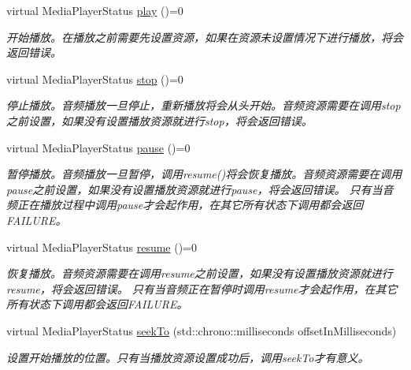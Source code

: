 \begin{DoxyCompactItemize}
virtual Media\+Player\+Status \hyperlink{classduerOSDcsSDK_1_1sdkInterfaces_1_1MediaPlayerInterface_a04f45089480e2177b42584ba51a073c0}{play} ()=0
\begin{DoxyCompactList}\small\item\em 开始播放。在播放之前需要先设置资源，如果在资源未设置情况下进行播放，将会返回错误。 \end{DoxyCompactList}\item 
virtual Media\+Player\+Status \hyperlink{classduerOSDcsSDK_1_1sdkInterfaces_1_1MediaPlayerInterface_ad9ddff784aa732be0a8b11706e3c9b09}{stop} ()=0
\begin{DoxyCompactList}\small\item\em 停止播放。音频播放一旦停止，重新播放将会从头开始。音频资源需要在调用stop之前设置，如果没有设置播放资源就进行stop，将会返回错误。 \end{DoxyCompactList}\item 
virtual Media\+Player\+Status \hyperlink{classduerOSDcsSDK_1_1sdkInterfaces_1_1MediaPlayerInterface_abb1516401c99e93714723360ef093ac9}{pause} ()=0
\begin{DoxyCompactList}\small\item\em 暂停播放。音频播放一旦暂停，调用resume()将会恢复播放。音频资源需要在调用pause之前设置，如果没有设置播放资源就进行pause，将会返回错误。 只有当音频正在播放过程中调用pause才会起作用，在其它所有状态下调用都会返回\+F\+A\+I\+L\+U\+R\+E。 \end{DoxyCompactList}\item 
virtual Media\+Player\+Status \hyperlink{classduerOSDcsSDK_1_1sdkInterfaces_1_1MediaPlayerInterface_affeabe3384e46924a96cd146e3c8dba0}{resume} ()=0
\begin{DoxyCompactList}\small\item\em 恢复播放。音频资源需要在调用resume之前设置，如果没有设置播放资源就进行resume，将会返回错误。 只有当音频正在暂停时调用resume才会起作用，在其它所有状态下调用都会返回\+F\+A\+I\+L\+U\+R\+E。 \end{DoxyCompactList}\item 
virtual Media\+Player\+Status \hyperlink{classduerOSDcsSDK_1_1sdkInterfaces_1_1MediaPlayerInterface_a90c26a82b954c116602034368351d05c}{seek\+To} (std\+::chrono\+::milliseconds offset\+In\+Milliseconds)
\begin{DoxyCompactList}\small\item\em 设置开始播放的位置。只有当播放资源设置成功后，调用seek\+To才有意义。 \end{DoxyCompactList}\item 

\end{DoxyCompactItemize}
